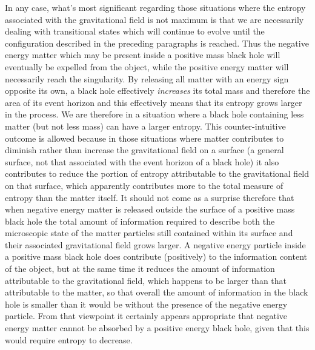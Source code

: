 \documentclass[notitlepage,12pt]{report}
\begin{document}
In any case, what's most significant regarding those situations where the entropy associated with the gravitational field is not maximum is that we are necessarily dealing with transitional states which will continue to evolve until the configuration described in the preceding paragraphs is reached. Thus the negative energy matter which may be present inside a positive mass black hole will eventually be expelled from the object, while the positive energy matter will necessarily reach the singularity. By releasing all matter with an energy sign opposite its own, a black hole effectively \textit{increases} its total mass and therefore the area of its event horizon and this effectively means that its entropy grows larger in the process. We are therefore in a situation where a black hole containing less matter (but not less mass) can have a larger entropy. This counter-intuitive outcome is allowed because in those situations where matter contributes to diminish rather than increase the gravitational field on a surface (a general surface, not that associated with the event horizon of a black hole) it also contributes to reduce the portion of entropy attributable to the gravitational field on that surface, which apparently contributes more to the total measure of entropy than the matter itself. It should not come as a surprise therefore that when negative energy matter is released outside the surface of a positive mass black hole the total amount of information required to describe both the microscopic state of the matter particles still contained within its surface and their associated gravitational field grows larger. A negative energy particle inside a positive mass black hole does contribute (positively) to the information content of the object, but at the same time it reduces the amount of information attributable to the gravitational field, which happens to be larger than that attributable to the matter, so that overall the amount of information in the black hole is smaller than it would be without the presence of the negative energy particle. From that viewpoint it certainly appears appropriate that negative energy matter cannot be absorbed by a positive energy black hole, given that this would require entropy to decrease.
\end{document}
